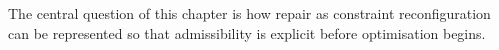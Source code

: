 The central question of this chapter is how repair as constraint reconfiguration can be represented so that admissibility is explicit before optimisation begins.
